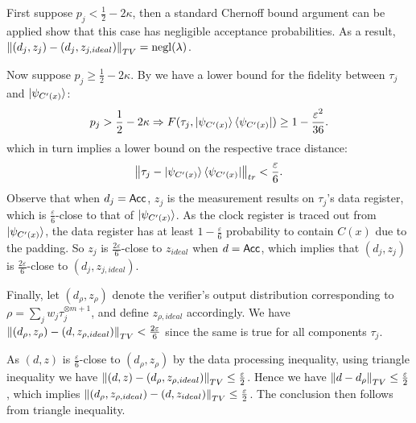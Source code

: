 \begin{prf}
	First suppose $p_j<\frac{1}{2}-2\kappa$,
	then a standard Chernoff bound argument can be applied show that this case has negligible acceptance probabilities.
	As a result, $\left\lVert(d_j, z_j)-(d_j, z_{j, ideal})\right\rVert_{TV}=\operatorname{negl}(\lambda)$.

	Now suppose $p_j\geq\frac{1}{2}-2\kappa$.
	By  we have a lower bound for the fidelity between $\tau_j$ and $\ket{\psi_{C'(x)}}$:
	$$p_j>\frac{1}{2}-2\kappa\Rightarrow F(\tau_j, \ket{\psi_{C'(x)}}\bra{\psi_{C'(x)}})\geq1-\frac{\varepsilon^2}{36}.$$
	which in turn implies a lower bound on the respective trace distance:
	$$\left\lVert\tau_j - \ket{\psi_{C'(x)}}\bra{\psi_{C'(x)}}\right\rVert_{tr}<\frac{\varepsilon}{6}.$$
	Observe that when $d_j=\mathsf{Acc}$, $z_j$ is the measurement results on $\tau_j$'s data register,
	which is $\frac{\varepsilon}{6}$-close to that of $\ket{\psi_{C'(x)}}$.
	As the clock register is traced out from $\ket{\psi_{C'(x)}}$, the data register has at least $1-\frac{\varepsilon}{6}$ probability to contain $C(x)$ due to the padding.
	So $z_j$ is $\frac{2\varepsilon}{6}$-close to $z_{ideal}$ when $d=\mathsf{Acc}$,
	which implies that $(d_j, z_j)$ is $\frac{2\varepsilon}{6}$-close to $(d_j, z_{j, ideal})$.

    Finally, let $(d_\rho, z_\rho)$ denote the verifier's output distribution corresponding to $\rho=\sum_j w_j\tau_j^{\otimes m+1}$,
	and define $z_{\rho, ideal}$ accordingly.
	We have $\left\lVert(d_\rho, z_\rho) - (d, z_{\rho, ideal})\right\rVert_{TV} < \frac{2\varepsilon}{6}$ since the same is true for all components $\tau_j$.

	As $(d, z)$ is $\frac{\varepsilon}{6}$-close to $(d_\rho, z_\rho)$ by the data processing inequality,
	using triangle inequality we have $\left\lVert(d, z) - (d_\rho, z_{\rho, ideal})\right\rVert_{TV}\leq\frac{\varepsilon}{2}$.
	Hence we have $\left\lVert d - d_\rho\right\rVert_{TV}\leq\frac{\varepsilon}{2}$, which implies $\left\lVert(d_\rho, z_{\rho, ideal}) - (d, z_{ideal})\right\rVert_{TV}\leq\frac{\varepsilon}{2}$.
	The conclusion then follows from triangle inequality.
\end{prf}
